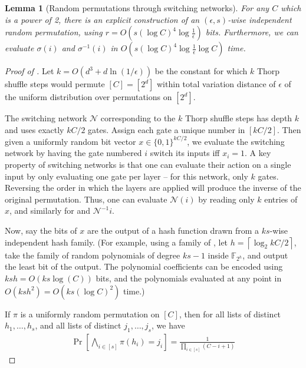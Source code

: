 \documentclass[10pt]{article}
\newtheorem{lemma}[theorem]{Lemma}
\theoremstyle{definition}\newtheorem{definition}[lemma]{Definition}
\theoremstyle{remark}  \newtheorem*{remark}{Remark}
\newcommand{\FF}{\mathbb{F}}
\newcommand{\cN}{\mathcal{N}}
\newcommand{\ceil}[1]{{\left\lceil{#1}\right\rceil}}
\newcommand{\mscomment}[1]{%
  \marginpar{\color{BrickRed}!!!}[{\color{BrickRed}\bf MS: #1}]}
\begin{document}

\begin{lemma}[Random permutations through switching networks]\label{lem:fast-permutations}
  For any $C$ which is a power of 2, there is an explicit construction of an $(\epsilon,s)$-wise independent
  random permutation, using $r = O(s (\log C)^4 \log \frac{1}{\epsilon})$ bits. Furthermore, we can evaluate $\sigma(i)$ and $\sigma^{-1}(i)$ in $O(s (\log C)^4 \log \frac{1}{\epsilon} \log C)$ time.
\end{lemma}

\begin{proof}[Proof of ]
  Let $k = O(d^3 + d \ln(1/\epsilon))$ be the constant for which $k$ Thorp shuffle steps would permute $[C] = [2^d]$ within total variation distance of $\epsilon$ of the uniform distribution over permutations on $[2^d]$.
  
  
  The switching network $\cN$ corresponding to the $k$ Thorp shuffle steps has depth $k$ and uses exactly $k C / 2$ gates. Assign each gate a unique number in $[kC/2]$. Then given a uniformly random bit vector $x \in \{0,1\}^{k C / 2}$, we evaluate the switching network by having the gate numbered $i$ switch its inputs iff $x_i = 1$. A key property of switching networks is that one can evaluate their action on a single
  input by only evaluating one gate per layer -- for this network, only $k$ gates. Reversing the order in which the layers are applied will produce the inverse of the original permutation. Thus, one can evaluate
  $\cN(i)$ by reading only $k$ entries of $x$, and similarly for and $\cN^{-1}{i}$.
  
  Now, say the bits of $x$ are the output of a hash function drawn from a $k s$-wise independent hash family. (For example, using a family of \cite{WegmanC81}, let $h = \ceil{\log_2{k C / 2}}$, take the family of random polynomials of degree $k s - 1$ inside $\FF_{2^{h}}$, and output the least bit of the output. The polynomial coefficients can be encoded using $k s h = O(k s \log(C))$ bits, and the polynomials evaluated at any point in $O(k s h^2 ) = O(k s (\log C)^2 )$ time.)
  
  If $\pi$ is a uniformly random permutation on $[C]$, then for all lists of distinct $h_1,\ldots,h_s$, and all lists of distinct $j_1,\ldots,j_s$, we have
  \begin{align*}
    \Pr[\bigwedge_{i\in[s]} \pi(h_i) = j_i] = \frac{1}{\prod_{i \in [s]} (C - i + 1)}
  \end{align*}
  

\end{proof}
\end{document}

